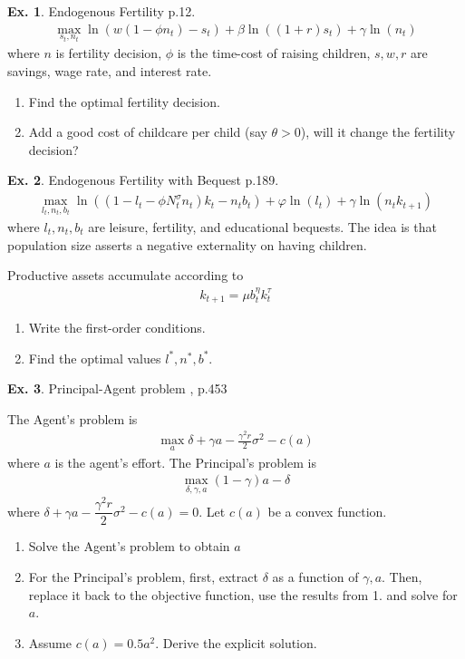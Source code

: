 \documentclass[11pt,a4paper]{book}
\theoremstyle{definition}\newtheorem{definition}{Definition}
\theoremstyle{definition}\newtheorem{fact}{Fact}
\theoremstyle{definition}\newtheorem{remark}{Remark}
\theoremstyle{definition}\newtheorem{ex}{Ex.}
\theoremstyle{definition}\newtheorem{project}{Project}
\theoremstyle{definition}\newtheorem{problem}{Problem}
\theoremstyle{definition}\newtheorem{example}{Example}
\numberwithin{theorem}{section}
\numberwithin{corollary}{chapter}
\numberwithin{assumption}{chapter}
\numberwithin{definition}{chapter}
\numberwithin{prop}{chapter}
\numberwithin{notation}{chapter}
\numberwithin{problem}{chapter}
\numberwithin{example}{chapter}
\numberwithin{fact}{chapter}
\numberwithin{ex}{chapter}
\begin{document}
	\begin{ex}
	Endogenous Fertility \citep{de2012fertility} p.12.
		\begin{align*}
			 \max_{s_t, n_t}  \ln (w(1-\phi n_t) - s_t) + \beta \ln((1+r)s_t) + \gamma \ln (n_t)
		\end{align*}
		where $n$ is fertility decision, $\phi$ is the time-cost of raising children, $s, w, r$ are savings, wage rate, and interest rate.
		\begin{enumerate}
			\item Find the optimal fertility decision.
			\item Add a good cost of childcare per child (say $\theta > 0$), will it change the fertility decision?
		\end{enumerate}
	\end{ex}
	
	\begin{ex} Endogenous Fertility with Bequest \citep{de2012fertility} p.189.
		\begin{align*}
			\max_{l_t,n_t,b_t}  \ln ( (1-l_t-\phi N_t^\sigma n_t)k_t - n_t b_t) + \varphi \ln (l_t) + \gamma  \ln(n_t k_{t+1} )
		\end{align*}
		where $l_t, n_t, b_t$ are leisure, fertility, and educational bequests. The idea is that population size asserts a negative externality on having children.
		
		Productive assets accumulate according to
		\begin{align*}
			k_{t+1} = \mu b_t^\eta k_t^\tau
		\end{align*}
		
		\begin{enumerate}
			\item Write the first-order conditions.
			\item Find the optimal values $l^*, n^*, b^*$.
		\end{enumerate}
	\end{ex}
	
	\begin{ex}
		Principal-Agent problem \citep{varian1992microeconomic}, p.453
		
		The Agent's problem is
		\begin{align*}
			\max_a \delta + \gamma a - \frac{\gamma^2 r}{2} \sigma^2 - c(a)
		\end{align*}
		where $a$ is the agent's effort.
		The Principal's problem is
		\begin{align*}
			\max_{\delta,\gamma, a} (1-\gamma)a - \delta 
		\end{align*}
		where $\delta + \gamma a - \dfrac{\gamma^2 r}{2} \sigma^2 - c(a) = 0$. Let $c(a)$ be a convex function.
		\begin{enumerate}
			\item Solve the Agent's problem to obtain $a$
			\item For the Principal's problem, first, extract $\delta$ as a function of $\gamma,a$. Then, replace it back to the objective function, use the results from 1. and solve for $a$.
			\item Assume $c(a) = 0.5 a^2$. Derive the explicit solution.
		\end{enumerate}
	\end{ex}
	
\end{document}

